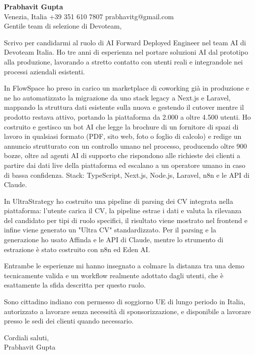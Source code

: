 \documentclass[a4paper,10.5pt]{article}
\begin{document}
\textbf{Prabhavit Gupta}\\
Venezia, Italia \textbar{} +39 351 610 7807 \textbar{} prabhavitg@gmail.com\\[10pt]
Gentile team di selezione di Devoteam,

Scrivo per candidarmi al ruolo di AI Forward Deployed Engineer nel team AI di Devoteam Italia. Ho tre anni di esperienza nel portare soluzioni AI dal prototipo alla produzione, lavorando a stretto contatto con utenti reali e integrandole nei processi aziendali esistenti.

In FlowSpace ho preso in carico un marketplace di coworking già in produzione e ne ho automatizzato la migrazione da uno stack legacy a Next.js e Laravel, mappando la struttura dati esistente sulla nuova e gestendo il cutover mentre il prodotto restava attivo, portando la piattaforma da 2.000 a oltre 4.500 utenti. Ho costruito e gestisco un bot AI che legge la brochure di un fornitore di spazi di lavoro in qualsiasi formato (PDF, sito web, foto o foglio di calcolo) e redige un annuncio strutturato con un controllo umano nel processo, producendo oltre 900 bozze, oltre ad agenti AI di supporto che rispondono alle richieste dei clienti a partire dai dati live della piattaforma ed escalano a un operatore umano in caso di bassa confidenza. Stack: TypeScript, Next.js, Node.js, Laravel, n8n e le API di Claude.

In UltraStrategy ho costruito una pipeline di parsing dei CV integrata nella piattaforma: l'utente carica il CV, la pipeline estrae i dati e valuta la rilevanza del candidato per tipi di ruolo specifici, il risultato viene mostrato nel frontend e infine viene generato un "Ultra CV" standardizzato. Per il parsing e la generazione ho usato Affinda e le API di Claude, mentre lo strumento di estrazione è stato costruito con n8n ed Eden AI.

Entrambe le esperienze mi hanno insegnato a colmare la distanza tra una demo tecnicamente valida e un workflow realmente adottato dagli utenti, che è esattamente la sfida descritta per questo ruolo.

Sono cittadino indiano con permesso di soggiorno UE di lungo periodo in Italia, autorizzato a lavorare senza necessità di sponsorizzazione, e disponibile a lavorare presso le sedi dei clienti quando necessario.

Cordiali saluti,\\
Prabhavit Gupta
\end{document}
